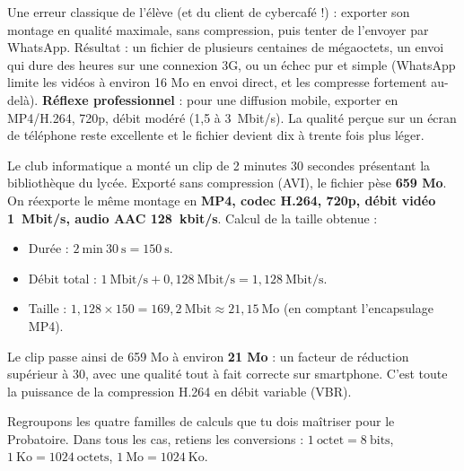 \documentclass[11pt]{article}
\newcounter{popsec}
\newcounter{popsub}
\newcommand{\courssub}[1]{%
  \stepcounter{popsub}%
  \par\vspace{9pt}\noindent{\popxbold\fontsize{11.5}{13}\selectfont\color{popink}{\color{poporange}\thepopsec.\thepopsub}\hspace{6pt}#1}\par\nopagebreak\vspace{4pt}
}
\begin{document}
\begin{attention}
Une erreur classique de l'élève (et du client de cybercafé !) : exporter son montage en qualité maximale, sans compression, puis tenter de l'envoyer par WhatsApp. Résultat : un fichier de plusieurs centaines de mégaoctets, un envoi qui dure des heures sur une connexion 3G, ou un échec pur et simple (WhatsApp limite les vidéos à environ 16 Mo en envoi direct, et les compresse fortement au-delà). \textbf{Réflexe professionnel} : pour une diffusion mobile, exporter en MP4/H.264, 720p, débit modéré (1,5 à \SI{3}{Mbit/s}). La qualité perçue sur un écran de téléphone reste excellente et le fichier devient dix à trente fois plus léger.
\end{attention}

\begin{exemplebox}
Le club informatique a monté un clip de 2 minutes 30 secondes présentant la bibliothèque du lycée. Exporté sans compression (AVI), le fichier pèse \textbf{659 Mo}. On réexporte le même montage en \textbf{MP4, codec H.264, 720p, débit vidéo \SI{1}{Mbit/s}, audio AAC \SI{128}{kbit/s}}. Calcul de la taille obtenue :
\begin{itemize}
\item Durée : $2\ \text{min}\ 30\ \text{s} = 150\ \text{s}$.
\item Débit total : $1\ \text{Mbit/s} + 0{,}128\ \text{Mbit/s} = 1{,}128\ \text{Mbit/s}$.
\item Taille : $1{,}128 \times 150 = 169{,}2\ \text{Mbit} \approx 21{,}15\ \text{Mo}$ (en comptant l'encapsulage MP4).
\end{itemize}
Le clip passe ainsi de 659 Mo à environ \textbf{21 Mo} : un facteur de réduction supérieur à 30, avec une qualité tout à fait correcte sur smartphone. C'est toute la puissance de la compression H.264 en débit variable (VBR).
\end{exemplebox}

\courssub{Bilan des calculs exigibles}

Regroupons les quatre familles de calculs que tu dois maîtriser pour le Probatoire. Dans tous les cas, retiens les conversions : $1\ \text{octet} = 8\ \text{bits}$, $1\ \text{Ko} = 1024\ \text{octets}$, $1\ \text{Mo} = 1024\ \text{Ko}$.
\end{document}
